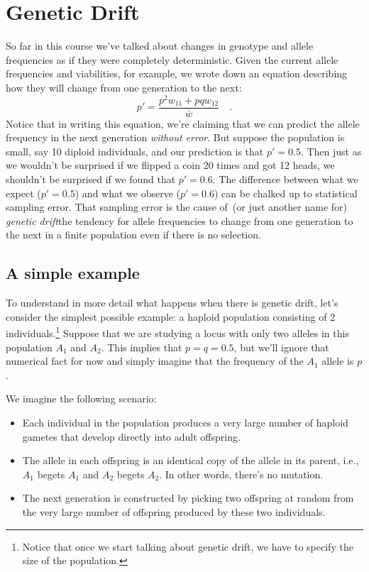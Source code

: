 \chapter{Genetic Drift}

So far in this course we've talked about changes in genotype and
allele frequencies as if they were completely deterministic. Given the
current allele frequencies and viabilities, for example, we wrote down
an equation describing how they will change from one generation to the
next:
\[
p' = \frac{p^2w_{11} + pqw_{12}}{\bar w} \quad .
\]
Notice that in writing this equation, we're claiming that we can
predict the allele frequency in the next generation {\it without
error}. But suppose the population is small, say 10 diploid
individuals, and our prediction is that $p' = 0.5$. Then just as we
wouldn't be surprised if we flipped a coin 20 times and got 12 heads,
we shouldn't be surprised if we found that $p' = 0.6$. The difference
between what we expect ($p' = 0.5$) and what we observe ($p' = 0.6$)
can be chalked up to statistical sampling error. That sampling error
is the cause of~(or just another name for) {\it genetic
drift}{\dash}the tendency for allele frequencies to change from one
generation to the next in a finite population even if there is no
selection.

\section*{A simple example}

To understand in more detail what happens when there is genetic drift,
let's consider the simplest possible example: a haploid population
consisting of 2 individuals.\footnote{Notice that once we start
  talking about genetic drift, we have to specify the size of the
  population.} Suppose that we are studying a locus with only two
alleles in this population $A_1$ and $A_2$. This implies that $p = q =
0.5$, but we'll ignore that numerical fact for now and simply imagine
that the frequency of the $A_1$ allele is $p$.

We imagine the following scenario:

\begin{itemize}

\item Each individual in the population produces a very large number
  of haploid gametes that develop directly into adult offspring.

\item The allele in each offspring is an identical copy of the allele
  in its parent, i.e., $A_1$ begets $A_1$ and $A_2$ begets $A_2$. In
  other words, there's no mutation.

\item The next generation is constructed by picking two offspring at
  random from the very large number of offspring produced by these two
  individuals.

\end{itemize}

